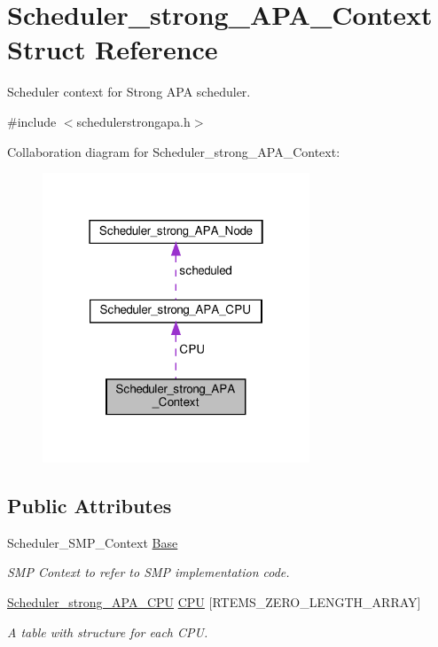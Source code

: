 \hypertarget{structScheduler__strong__APA__Context}{}\section{Scheduler\+\_\+strong\+\_\+\+A\+P\+A\+\_\+\+Context Struct Reference}
\label{structScheduler__strong__APA__Context}


Scheduler context for Strong A\+PA scheduler.  




{\ttfamily \#include $<$schedulerstrongapa.\+h$>$}



Collaboration diagram for Scheduler\+\_\+strong\+\_\+\+A\+P\+A\+\_\+\+Context\+:\nopagebreak
\begin{figure}[H]
\begin{center}
\leavevmode
\includegraphics[width=226pt]{structScheduler__strong__APA__Context__coll__graph}
\end{center}
\end{figure}
\subsection*{Public Attributes}
\begin{DoxyCompactItemize}
\item 
Scheduler\+\_\+\+S\+M\+P\+\_\+\+Context \hyperlink{structScheduler__strong__APA__Context_a55755b445b7e7beaf1b87b178521e615}{Base}
\begin{DoxyCompactList}\small\item\em S\+MP Context to refer to S\+MP implementation code. \end{DoxyCompactList}\item 
\hyperlink{structScheduler__strong__APA__CPU}{Scheduler\+\_\+strong\+\_\+\+A\+P\+A\+\_\+\+C\+PU} \hyperlink{structScheduler__strong__APA__Context_afdc7dcc1fef07a07130a8ddde0895e9c}{C\+PU} \mbox{[}R\+T\+E\+M\+S\+\_\+\+Z\+E\+R\+O\+\_\+\+L\+E\+N\+G\+T\+H\+\_\+\+A\+R\+R\+AY\mbox{]}
\begin{DoxyCompactList}\small\item\em A table with structure for each C\+PU. \end{DoxyCompactList}\end{DoxyCompactItemize}


